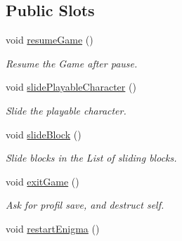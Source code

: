\subsection*{Public Slots}
\begin{DoxyCompactItemize}
\item 
\hypertarget{class_g___gameboard_a1e25a7b0f6613e95a1f511456da194be}{}void \hyperlink{class_g___gameboard_a1e25a7b0f6613e95a1f511456da194be}{resume\+Game} ()\label{class_g___gameboard_a1e25a7b0f6613e95a1f511456da194be}

\begin{DoxyCompactList}\small\item\em Resume the Game after pause. \end{DoxyCompactList}\item 
\hypertarget{class_g___gameboard_abf8df9d44eaa471ad102887ec901ab78}{}void \hyperlink{class_g___gameboard_abf8df9d44eaa471ad102887ec901ab78}{slide\+Playable\+Character} ()\label{class_g___gameboard_abf8df9d44eaa471ad102887ec901ab78}

\begin{DoxyCompactList}\small\item\em Slide the playable character. \end{DoxyCompactList}\item 
\hypertarget{class_g___gameboard_acfa547e03c2451bda2b28cc1d9a7ed2d}{}void \hyperlink{class_g___gameboard_acfa547e03c2451bda2b28cc1d9a7ed2d}{slide\+Block} ()\label{class_g___gameboard_acfa547e03c2451bda2b28cc1d9a7ed2d}

\begin{DoxyCompactList}\small\item\em Slide blocks in the List of sliding blocks. \end{DoxyCompactList}\item 
\hypertarget{class_g___gameboard_aed56d94cf1c9bac8790b3405f8cdb76d}{}void \hyperlink{class_g___gameboard_aed56d94cf1c9bac8790b3405f8cdb76d}{exit\+Game} ()\label{class_g___gameboard_aed56d94cf1c9bac8790b3405f8cdb76d}

\begin{DoxyCompactList}\small\item\em Ask for profil save, and destruct self. \end{DoxyCompactList}\item 
\hypertarget{class_g___gameboard_ad0b089132d43872c36b24e06baf44993}{}void \hyperlink{class_g___gameboard_ad0b089132d43872c36b24e06baf44993}{restart\+Enigma} ()\label{class_g___gameboard_ad0b089132d43872c36b24e06baf44993}


\end{DoxyCompactItemize}
